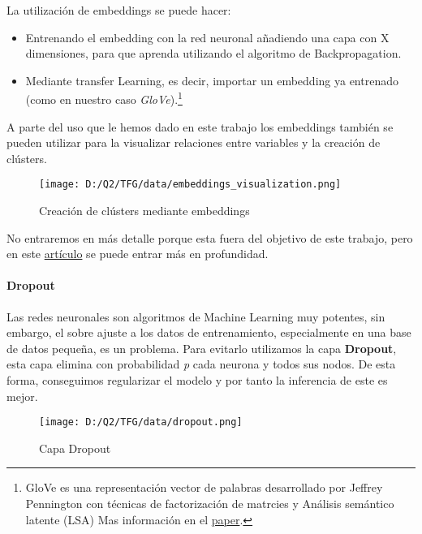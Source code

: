 \documentclass[10pt,riqno,a4paper,twoside]{article}\usepackage[]{graphicx}\usepackage[]{color}
\begin{document}
La utilización de embeddings se puede hacer:
\begin{itemize}

\item{Entrenando el embedding con la red neuronal añadiendo una capa con X dimensiones, para que aprenda utilizando el algoritmo de Backpropagation.}

\item{Mediante transfer Learning, es decir, importar un embedding ya entrenado (como en nuestro caso \label{GloVe}\textit{GloVe}).\footnote{GloVe es una representación vector de palabras desarrollado por Jeffrey Pennington con técnicas de factorización de matrcies y Análisis semántico latente (LSA) Mas información en el \href{https://nlp.stanford.edu/pubs/glove.pdf}{paper}.\cite{LSA}}}


\end{itemize}

A parte del uso que le hemos dado en este trabajo los embeddings también se pueden utilizar para la visualizar relaciones entre variables y la creación de clústers.\clearpage


\begin{figure}[h]
\caption{Creación de clústers mediante embeddings}
\begin{center}
\texttt{[image: D:/Q2/TFG/data/embeddings\_visualization.png]}
\end{center}
\end{figure}

No entraremos en más detalle porque esta fuera del objetivo de este trabajo, pero en este \href{https://towardsdatascience.com/visualizing-feature-vectors-embeddings-using-pca-and-t-sne-ef157cea3a42}{artículo} \cite{visualization_word_embedd} se puede entrar más en profundidad.

 
\paragraph{Dropout}

\label{drop}
Las redes neuronales son algoritmos de Machine Learning muy potentes, sin embargo, el sobre ajuste a los datos de entrenamiento, especialmente en una base de datos pequeña, es un problema. Para evitarlo utilizamos la capa \textbf{Dropout}, esta capa elimina con probabilidad \textit{p} cada neurona y todos sus nodos. De esta forma, conseguimos regularizar el modelo y por tanto la inferencia de este es mejor.


\begin{figure}[h]
\begin{center}
  \caption{Capa Dropout}
\texttt{[image: D:/Q2/TFG/data/dropout.png]}
\end{center}
\end{figure}
\end{document}
